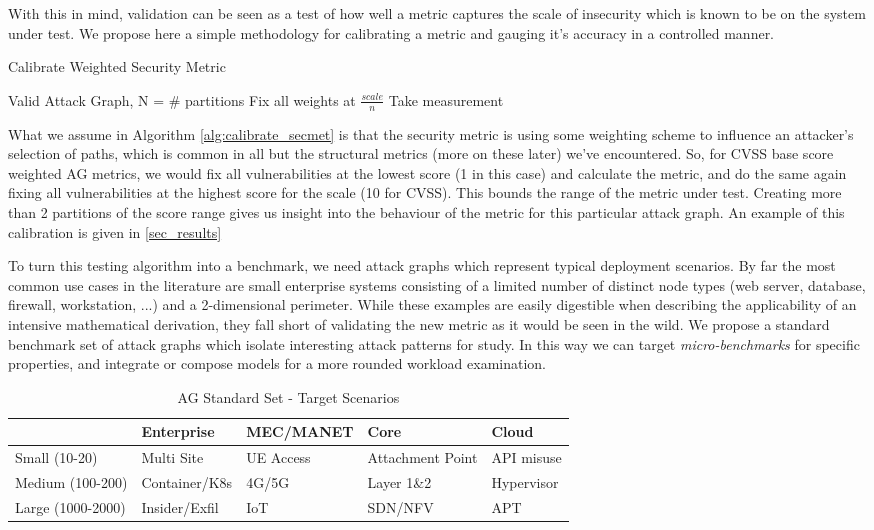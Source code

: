 With this in mind, validation can be seen as a test of how well a metric captures the scale of insecurity which is known to be on the system under test. We propose here a simple methodology for calibrating a metric and gauging it's accuracy in a controlled manner. 

\begin{algorithm}
\caption{Calibrate Weighted Security Metric}
\label{alg:calibrate_secmet}
\begin{algorithmic}
\REQUIRE Valid Attack Graph, N = \# partitions
 \STATE Fix all weights at $\frac{scale}{n}$ 
 \STATE Take measurement
\ENDFOR
 \end{algorithmic}
\end{algorithm}

What we assume in Algorithm \ref{alg:calibrate_secmet} is that the security metric is using some weighting scheme to influence an attacker's selection of paths, which is common in all but the structural metrics (more on these later) we've encountered. So, for CVSS base score weighted AG metrics, we would fix all vulnerabilities at the lowest score (1 in this case) and calculate the metric, and do the same again fixing all vulnerabilities at the highest score for the scale (10 for CVSS). This bounds the range of the metric under test. Creating more than 2 partitions of the score range gives us insight into the behaviour of the metric for this particular attack graph. An example of this calibration is given in \ref{sec_results}

To turn this testing algorithm into a benchmark, we need attack graphs which represent typical deployment scenarios. By far the most common use cases in the literature are small enterprise systems consisting of a limited number of distinct node types (web server, database, firewall, workstation, ...) and a 2-dimensional perimeter. While these examples are easily digestible when describing the applicability of an intensive mathematical derivation, they fall short of validating the new metric as it would be seen in the wild. We propose a standard benchmark set of attack graphs which isolate interesting attack patterns for study. In this way we can target \textit{micro-benchmarks} for specific properties, and integrate or compose models for a more rounded workload examination.

\begin{table*}[ht]
\centering
\caption{AG Standard Set - Target Scenarios}
\label{tab:ag_standard_set}
\begin{tabular}{@{}p{.15\linewidth}p{.15\linewidth}p{.15\linewidth}p{.15\linewidth}p{.15\linewidth}@{}}
\toprule
 & Enterprise & MEC/MANET &  Core &  Cloud \\ \midrule
Small (10-20) & Multi Site & UE Access  & Attachment Point & API misuse \\
Medium (100-200) & Container/K8s & 4G/5G & Layer 1\&2 & Hypervisor  \\
Large (1000-2000) & Insider/Exfil  &  IoT &  SDN/NFV & APT  \\ \bottomrule
\end{tabular}
\end{table*}

